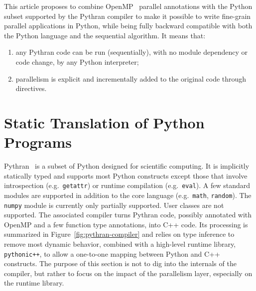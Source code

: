 \documentclass[conference]{IEEEtran}
\begin{document}
This article proposes to combine OpenMP~\cite{openmp3.1} parallel annotations
with the Python subset supported by the Pythran compiler to make it possible to
write fine-grain parallel applications in Python, while being fully backward
compatible with both the Python language and the sequential algorithm. It means
that:

\begin{enumerate}

    \item any Pythran code can be run (sequentially), with no module dependency
        or code change, by any Python interpreter;

    \item parallelism is explicit and incrementally added to the original code
        through directives.

\end{enumerate}

\section{Static Translation of Python Programs}\label{sec:python-static}

Pythran~\cite{pythran2013} is a subset of Python designed for scientific
computing. It is implicitly statically typed and supports most Python constructs
except those that involve introspection (e.g.\ \texttt{getattr}) or runtime
compilation (e.g.\ \texttt{eval}). A few standard modules are supported in
addition to the core language (e.g.\ \texttt{math}, \texttt{random}). The
\texttt{numpy} module is currently only partially supported. User classes are
not supported. The associated compiler turns Pythran code, possibly annotated
with OpenMP and a few function type annotations, into C++ code. Its processing
is summarized in Figure~\ref{fig:pythran-compiler} and relies on type inference
to remove most dynamic behavior, combined with a high-level runtime library,
\texttt{pythonic++}, to allow a one-to-one mapping between Python and C++
constructs. The purpose of this section is not to dig into the internals of the
compiler, but rather to focus on the impact of the parallelism layer, especially
on the runtime library.
\end{document}
